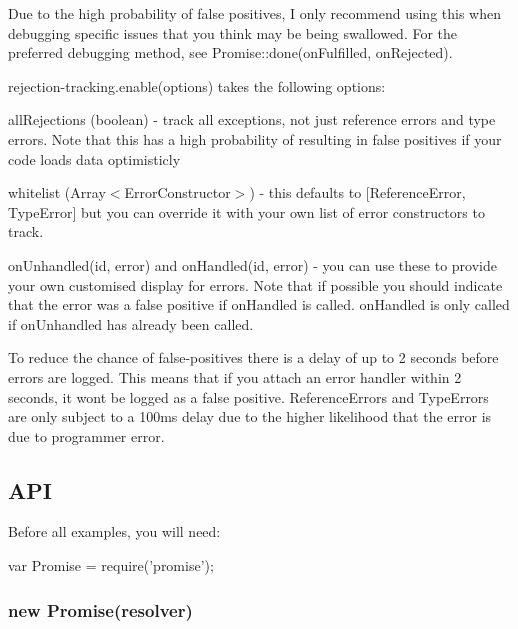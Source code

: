 Due to the high probability of false positives, I only recommend using this when debugging specific issues that you think may be being swallowed. For the preferred debugging method, see {\ttfamily Promise\+::done(on\+Fulfilled, on\+Rejected)}.

{\ttfamily rejection-\/tracking.\+enable(options)} takes the following options\+:


\begin{DoxyItemize}
\item all\+Rejections ({\ttfamily boolean}) -\/ track all exceptions, not just reference errors and type errors. Note that this has a high probability of resulting in false positives if your code loads data optimisticly
\item whitelist ({\ttfamily Array$<$Error\+Constructor$>$}) -\/ this defaults to {\ttfamily \mbox{[}Reference\+Error, Type\+Error\mbox{]}} but you can override it with your own list of error constructors to track.
\item {\ttfamily on\+Unhandled(id, error)} and {\ttfamily on\+Handled(id, error)} -\/ you can use these to provide your own customised display for errors. Note that if possible you should indicate that the error was a false positive if {\ttfamily on\+Handled} is called. {\ttfamily on\+Handled} is only called if {\ttfamily on\+Unhandled} has already been called.
\end{DoxyItemize}

To reduce the chance of false-\/positives there is a delay of up to 2 seconds before errors are logged. This means that if you attach an error handler within 2 seconds, it won\textquotesingle{}t be logged as a false positive. Reference\+Errors and Type\+Errors are only subject to a 100ms delay due to the higher likelihood that the error is due to programmer error.

\subsection*{A\+PI}

Before all examples, you will need\+:


\begin{DoxyCode}
var Promise = require('promise');
\end{DoxyCode}


\subsubsection*{new Promise(resolver)}

